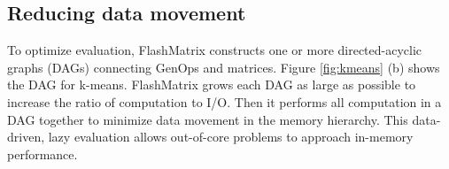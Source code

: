 


\vspace{-8pt}
\subsection{Reducing data movement}\label{sec:datamove}
\vspace{-4pt}
To optimize evaluation, FlashMatrix constructs one or more directed-acyclic graphs (DAGs) 
connecting GenOps and matrices.
Figure \ref{fig:kmeans} (b) shows the DAG for k-means.
FlashMatrix grows each DAG as large as possible to increase the ratio of 
computation to I/O. Then it performs all computation in a DAG together 
to minimize data movement in the memory hierarchy.
This data-driven, lazy evaluation allows out-of-core problems 
to approach in-memory performance.

